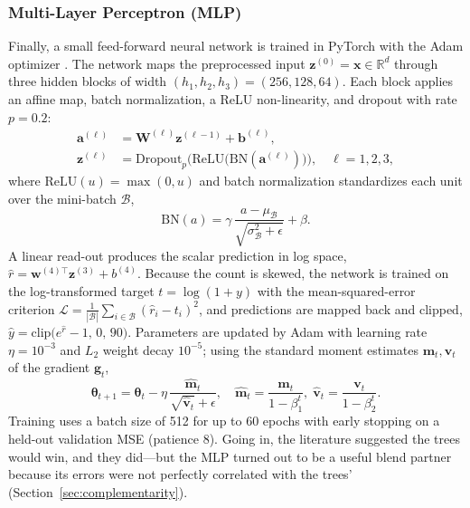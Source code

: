 \documentclass[journal]{IEEEtran}
\begin{document}
\subsubsection{Multi-Layer Perceptron (MLP)}
\label{sec:mlp}
Finally, a small feed-forward neural network is trained in PyTorch
\cite{paszke2019pytorch} with the Adam optimizer \cite{kingma2015adam}. The network maps the preprocessed input
$\mathbf{z}^{(0)}=\mathbf{x}\in\mathbb{R}^{d}$ through three hidden blocks of
width $(h_1,h_2,h_3)=(256,128,64)$. Each block applies an affine map, batch
normalization, a ReLU non-linearity, and dropout with rate $p=0.2$:
\begin{align}
\mathbf{a}^{(\ell)} &= \mathbf{W}^{(\ell)}\mathbf{z}^{(\ell-1)}+\mathbf{b}^{(\ell)},
\label{eq:mlp_aff}\\
\mathbf{z}^{(\ell)} &= \mathrm{Dropout}_{p}\!\Big(\mathrm{ReLU}\big(
\mathrm{BN}(\mathbf{a}^{(\ell)})\big)\Big),\quad \ell=1,2,3,
\label{eq:mlp_block}
\end{align}
where $\mathrm{ReLU}(u)=\max(0,u)$ and batch normalization standardizes each
unit over the mini-batch $\mathcal{B}$,
\begin{equation}
\mathrm{BN}(a)=\gamma\,\frac{a-\mu_{\mathcal{B}}}{\sqrt{\sigma_{\mathcal{B}}^{2}+\epsilon}}+\beta .
\label{eq:bn}
\end{equation}
A linear read-out produces the scalar prediction in log space,
$\hat r=\mathbf{w}^{(4)\top}\mathbf{z}^{(3)}+b^{(4)}$. Because the count is
skewed, the network is trained on the log-transformed target
$t=\log(1+y)$ with the mean-squared-error criterion
$\mathcal{L}=\tfrac{1}{|\mathcal{B}|}\sum_{i\in\mathcal{B}}(\hat r_i-t_i)^2$, and
predictions are mapped back and clipped,
$\hat y=\mathrm{clip}\big(e^{\hat r}-1,\,0,\,90\big)$. Parameters are updated by
Adam with learning rate $\eta=10^{-3}$ and $L_2$ weight decay $10^{-5}$; using
the standard moment estimates $\mathbf{m}_t,\mathbf{v}_t$ of the gradient
$\mathbf{g}_t$,
\begin{equation}
\boldsymbol{\theta}_{t+1}=\boldsymbol{\theta}_{t}
-\eta\,\frac{\hat{\mathbf m}_t}{\sqrt{\hat{\mathbf v}_t}+\epsilon},
\quad
\hat{\mathbf m}_t=\frac{\mathbf m_t}{1-\beta_1^{t}},\;
\hat{\mathbf v}_t=\frac{\mathbf v_t}{1-\beta_2^{t}}.
\label{eq:adam}
\end{equation}
Training uses a batch size of 512 for up to 60 epochs with early stopping on a
held-out validation MSE (patience 8). Going in, the literature
\cite{tang2024,camatti2024} suggested the trees would win, and they
did---but the MLP turned out to be a useful blend partner because its errors
were not perfectly correlated with the trees' (Section~\ref{sec:complementarity}).
\end{document}
